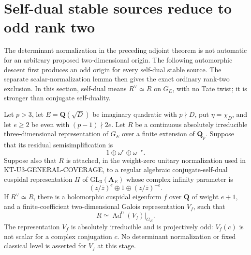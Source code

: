 \section{Self-dual stable sources reduce to odd rank two}
\label{sec:kt-selfdual-source-exclusion}

The determinant normalization in the preceding adjoint theorem is
not automatic for an arbitrary proposed two-dimensional origin.
The following automorphic descent first produces an odd origin for
every self-dual stable source.  The separate scalar-normalization
lemma then gives the exact ordinary rank-two exclusion.  In this
section, self-dual means $R^\vee\simeq R$ on $G_E$, with no Tate
twist; it is stronger than conjugate self-duality.

\begin{theorem}
Let $p>3$, let $E=\mathbf Q(\sqrt D)$ be imaginary quadratic with
$p\nmid D$, put $\eta=\chi_D$, and let $e\ge2$ be even with
$(p-1)\nmid2e$.
Let $R$ be a continuous absolutely irreducible three-dimensional
representation of $G_E$ over a finite extension of $\mathbf Q_p$.
Suppose that its residual semisimplification is
\[
                  1\oplus\omega^e\oplus\omega^{-e}.       \tag{SD.1}
\]
Suppose also that $R$ is attached, in the weight-zero unitary
normalization used in KT-U3-GENERAL-COVERAGE, to a regular algebraic
conjugate-self-dual cuspidal representation $\Pi$ of
$\mathrm{GL}_3(\mathbf A_E)$ whose complex infinity parameter is
\[
                 (z/\bar z)^e\oplus1\oplus(z/\bar z)^{-e}.
                                                               \tag{SD.2}
\]
If $R^\vee\simeq R$, there is a holomorphic cuspidal eigenform $f$
over $\mathbf Q$ of weight $e+1$, and a finite-coefficient
two-dimensional Galois representation $V_f$, such that
\[
              R\simeq\operatorname{Ad}^0(V_f)|_{G_E}.     \tag{SD.3}
\]
The representation $V_f$ is absolutely irreducible and is
projectively odd: $V_f(c)$ is not scalar for a complex conjugation
$c$.  No determinant normalization or fixed classical level is
asserted for $V_f$ at this stage.
\end{theorem}

